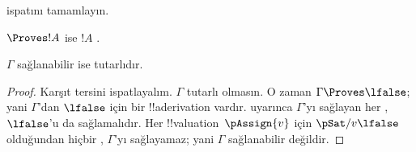 \documentclass[../../../include/open-logic-section]{subfiles}
\begin{document}
\begin{prob}
   ispatını tamamlayın.
\end{prob}
\tagendprob

\begin{cor}
$\Proves !A$ ise $!A$ .
\end{cor}

\begin{cor}
$\Gamma$ sağlanabilir ise tutarlıdır.
\end{cor}

\begin{proof}
Karşıt tersini ispatlayalım. $\Gamma$ tutarlı olmasın. O zaman
$\Gamma \Proves \lfalse$; yani $\Gamma$'dan $\lfalse$ için bir
!!a{derivation} vardır.  uyarınca $\Gamma$'yı sağlayan
her ,
$\lfalse$'u da sağlamalıdır. Her
{!!{valuation}~$\pAssign{v}$ için $\pSat/{v}{\lfalse}$} olduğundan hiçbir
, $\Gamma$'yı sağlayamaz; yani
$\Gamma$ sağlanabilir değildir.
\end{proof}
\end{document}
